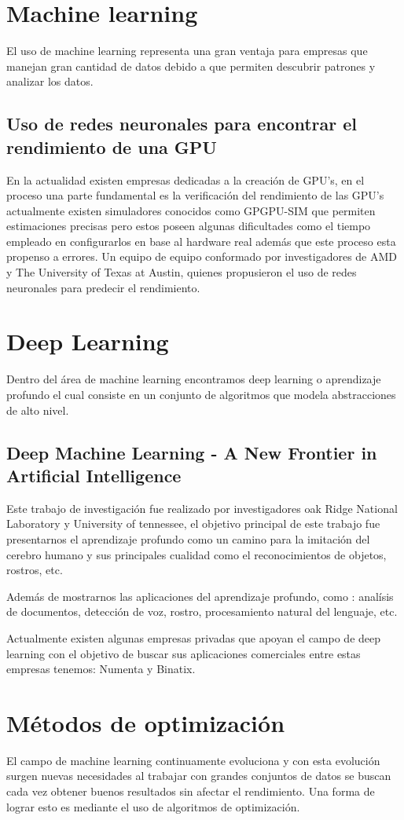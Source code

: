 \section{Machine learning}
El uso de machine learning representa una gran ventaja para empresas que manejan gran cantidad de datos debido a que permiten descubrir patrones y analizar los datos.

\subsection{Uso de redes neuronales para encontrar el rendimiento de una GPU}
En la actualidad existen empresas dedicadas a la creación de GPU's, en el proceso una parte fundamental es la verificación del rendimiento de las GPU's actualmente existen simuladores conocidos como GPGPU-SIM que permiten estimaciones precisas pero estos poseen algunas dificultades como el tiempo empleado en configurarlos en base al hardware real además que este proceso esta propenso a errores. Un equipo de equipo conformado por investigadores de AMD y The University of Texas at Austin, quienes propusieron el uso de redes neuronales para predecir el rendimiento.
\section{Deep Learning}
Dentro del área de machine learning  encontramos deep learning o aprendizaje profundo el cual consiste en un conjunto de algoritmos que modela abstracciones de alto nivel.

\subsection{Deep Machine Learning - A New Frontier in Artificial Intelligence}
Este trabajo de investigación fue realizado por investigadores oak Ridge National Laboratory y University of tennessee, el objetivo principal de este trabajo fue presentarnos el aprendizaje profundo como un camino para la imitación del cerebro humano y sus principales cualidad como el reconocimientos de objetos, rostros, etc.

Además de mostrarnos las aplicaciones del aprendizaje profundo, como : analísis de documentos, detección de voz, rostro, procesamiento natural del lenguaje, etc.

Actualmente existen algunas empresas privadas que apoyan el campo de deep learning con el objetivo de buscar sus aplicaciones comerciales entre estas empresas tenemos: Numenta y Binatix.
\section{Métodos de optimización}
El campo de machine learning continuamente evoluciona y con esta evolución surgen nuevas necesidades al trabajar con grandes conjuntos de datos se buscan cada vez obtener buenos resultados sin afectar el rendimiento. Una forma de lograr esto es mediante el uso de algoritmos de optimización.
